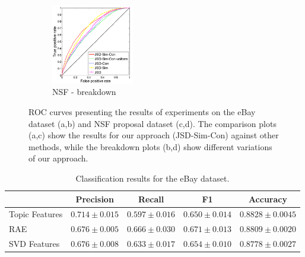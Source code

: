 \documentclass{article} %
\begin{document}
\begin{figure}
        ~ %
        \begin{subfigure}[b]{0.24\textwidth}
        	        \centering
                \includegraphics[width=36mm]{figures/nsf-breakdown-kopia.png}
               \caption{NSF - breakdown}
                \label{fig:nsf-breakdown}
        \end{subfigure}
       \caption{ROC curves presenting the results of experiments on
         the eBay dataset (a,b) and NSF proposal dataset (c,d). The
         comparison plots (a,c) show the results for our approach (JSD-Sim-Con)
         against other methods, while the breakdown plots (b,d)
         show different variations of our approach. }\label{fig:roc-curves}
\end{figure}

\begin{table}[t]
\caption{Classification results for the eBay dataset.}
\label{tab:classification-results}
\vspace{-4mm}
\begin{center}
\begin{tabular}{|l|c|c|c|c|}
\hline
&Precision & Recall & F1 & Accuracy
\\ \hline 
Topic Features         &$\mathbf{0.714}\pm 0.015$&$0.597\pm 0.016$&$0.650\pm
0.014$& $\mathbf{0.8828}\pm 0.0045$\\
RAE             &$0.676\pm 0.005$&$\mathbf{0.666}\pm 0.030$&$\mathbf{0.671}\pm
0.013$&$0.8809\pm 0.0020$ \\
SVD Features             &$0.676\pm 0.008$&$0.633\pm 0.017$&$0.654\pm
0.010$&$0.8778\pm 0.0027$\\
\hline
\end{tabular}
\end{center}
\end{table}

\end{document}

